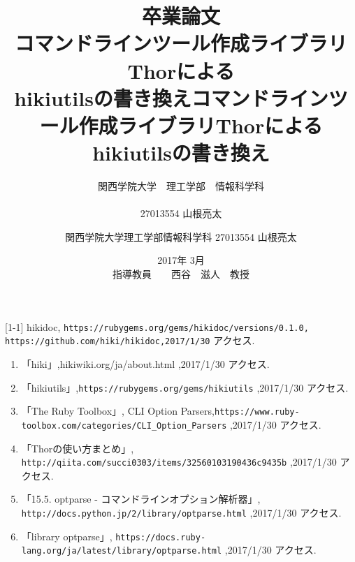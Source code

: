 \documentclass[12pt,a4paper]{jsarticle}
\begin{document}
\title{卒業論文\\
\vspace{4cm} コマンドラインツール作成ライブラリThorによる\\hikiutilsの書き換え}
\author{ 関西学院大学　理工学部　情報科学科\\\\27013554 山根亮太}
\date{\vspace{3cm} 2017年  3月\\
\vspace{3cm} 指導教員　　西谷　滋人　教授}
\maketitle
\tableofcontents

\title{コマンドラインツール作成ライブラリThorによるhikiutilsの書き換え}
\author{関西学院大学理工学部情報科学科 27013554 山根亮太}
\date{}
\maketitle
\tableofcontents





[1-1] hikidoc, \verb|https://rubygems.org/gems/hikidoc/versions/0.1.0,| \verb|https://github.com/hiki/hikidoc,2017/1/30| アクセス.

\begin{enumerate}
\item 「hiki」,hikiwiki.org/ja/about.html ,2017/1/30 アクセス.
\item 「hikiutils」,\verb|https://rubygems.org/gems/hikiutils| ,2017/1/30 アクセス.
\item 「The Ruby Toolbox」, CLI Option Parsers,\verb|https://www.ruby-toolbox.com/categories/CLI_Option_Parsers| ,2017/1/30 アクセス.
\item 「Thorの使い方まとめ」, \verb|http://qiita.com/succi0303/items/32560103190436c9435b| ,2017/1/30 アクセス.
\item 「15.5. optparse - コマンドラインオプション解析器」, \verb|http://docs.python.jp/2/library/optparse.html| ,2017/1/30 アクセス.
\item 「library optparse」, \verb|https://docs.ruby-lang.org/ja/latest/library/optparse.html| ,2017/1/30 アクセス.
\end{enumerate}
\end{document}
